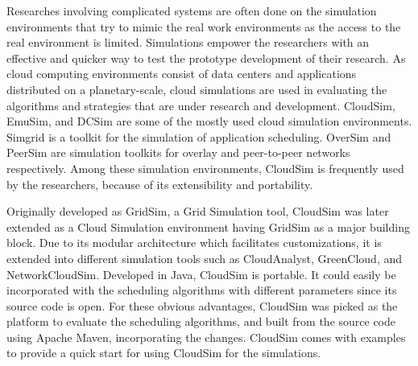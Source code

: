 \documentclass[times, 10pt,twocolumn]{article}
\begin{document}
Researches involving complicated systems are often done on the simulation environments that try to mimic the real work environments as the access to the real environment is limited. Simulations empower the researchers with an effective and quicker way to test the prototype development of their research. As cloud computing environments consist of data centers and applications distributed on a planetary-scale, cloud simulations are used in evaluating the algorithms and strategies that are under research and development. CloudSim, EmuSim\cite{emusim}, and DCSim\cite{dcsim} are some of the mostly used cloud simulation environments. Simgrid\cite{simgrid} is a toolkit for the simulation of application scheduling. OverSim\cite{oversim} and PeerSim\cite{peersim} are simulation toolkits for overlay and peer-to-peer networks respectively. Among these simulation environments, CloudSim is frequently used by the researchers, because of its extensibility and portability. 

Originally developed as GridSim, a Grid Simulation tool, CloudSim was later extended as a Cloud Simulation environment having GridSim as a major building block\cite{cloudgridsim}. Due to its modular architecture which facilitates customizations, it is extended into different simulation tools such as CloudAnalyst\cite{cloudanalyst}, GreenCloud\cite{greencloud}, and NetworkCloudSim\cite{ncloudsim}. Developed in Java, CloudSim is portable. It could easily be incorporated with the scheduling algorithms with different parameters since its source code is open. For these obvious advantages, CloudSim was picked as the platform to evaluate the scheduling algorithms, and built from the source code using Apache Maven, incorporating the changes. CloudSim comes with examples to provide a quick start for using CloudSim for the simulations.
\end{document}
